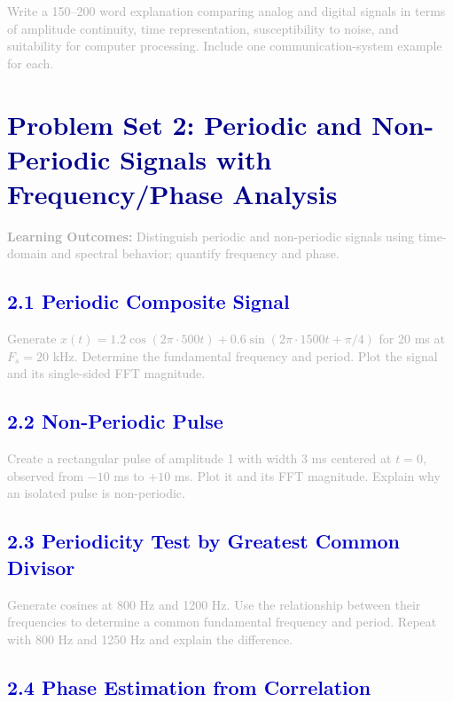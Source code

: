 \documentclass[12pt,a4paper]{article}
\begin{document}
\textcolor{darkgray}{
Write a 150--200 word explanation comparing analog and digital signals in terms of amplitude continuity, time representation, susceptibility to noise, and suitability for computer processing. Include one communication-system example for each.
}

\newpage

\section*{\LARGE\textbf{\textcolor{darkblue}{Problem Set 2: Periodic and Non-Periodic Signals with Frequency/Phase Analysis}}}

\textcolor{darkgray}{\textbf{Learning Outcomes:} Distinguish periodic and non-periodic signals using time-domain and spectral behavior; quantify frequency and phase.}

\subsection*{\large\textbf{\textcolor{mediumblue}{2.1 Periodic Composite Signal}}}

\textcolor{darkgray}{
Generate $x(t) = 1.2 \cos(2\pi \cdot 500t) + 0.6 \sin(2\pi \cdot 1500t + \pi/4)$ for 20 ms at $F_s = 20$ kHz. Determine the fundamental frequency and period. Plot the signal and its single-sided FFT magnitude.
}

\subsection*{\large\textbf{\textcolor{mediumblue}{2.2 Non-Periodic Pulse}}}

\textcolor{darkgray}{
Create a rectangular pulse of amplitude 1 with width 3 ms centered at $t = 0$, observed from $-10$ ms to $+10$ ms. Plot it and its FFT magnitude. Explain why an isolated pulse is non-periodic.
}

\subsection*{\large\textbf{\textcolor{mediumblue}{2.3 Periodicity Test by Greatest Common Divisor}}}

\textcolor{darkgray}{
Generate cosines at 800 Hz and 1200 Hz. Use the relationship between their frequencies to determine a common fundamental frequency and period. Repeat with 800 Hz and 1250 Hz and explain the difference.
}

\subsection*{\large\textbf{\textcolor{mediumblue}{2.4 Phase Estimation from Correlation}}}
\end{document}
